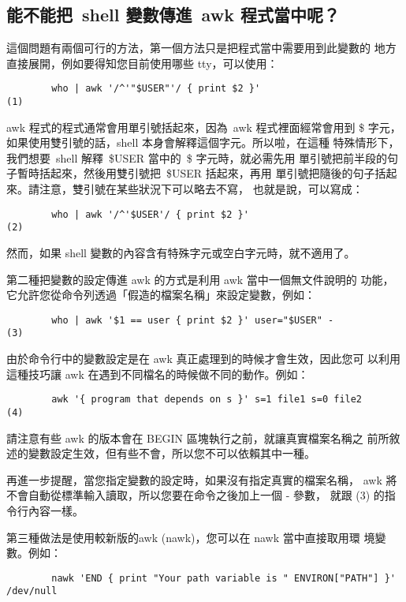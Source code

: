 \documentclass{article}
\begin{document}
\begin{CJK*}{Bg5}{ming}
\subsection{能不能把~shell 變數傳進~awk 程式當中呢？}

	這個問題有兩個可行的方法，第一個方法只是把程式當中需要用到此變數的
	地方直接展開，例如要得知您目前使用哪些 tty，可以使用：
\footnotesize
\begin{verbatim}
        who | awk '/^'"$USER"'/ { print $2 }'                           (1)
\end{verbatim}
\normalsize
	awk 程式的程式通常會用單引號括起來，因為~awk 程式裡面經常會用到 \$ 
	字元，如果使用雙引號的話，shell 本身會解釋這個字元。所以啦，在這種
	特殊情形下，我們想要~shell 解釋~\$USER 當中的~\$ 字元時，就必需先用
	單引號把前半段的句子暫時括起來，然後用雙引號把~\$USER 括起來，再用
	單引號把隨後的句子括起來。請注意，雙引號在某些狀況下可以略去不寫，
	也就是說，可以寫成：
\footnotesize
\begin{verbatim}
        who | awk '/^'$USER'/ { print $2 }'                             (2)
\end{verbatim}
\normalsize
	然而，如果 shell 變數的內容含有特殊字元或空白字元時，就不適用了。

	第二種把變數的設定傳進 awk 的方式是利用 awk 當中一個無文件說明的
	功能，它允許您從命令列透過「假造的檔案名稱」來設定變數，例如：
\footnotesize
\begin{verbatim}
        who | awk '$1 == user { print $2 }' user="$USER" -              (3)
\end{verbatim}
\normalsize
	由於命令行中的變數設定是在 awk 真正處理到的時候才會生效，因此您可
	以利用這種技巧讓 awk 在遇到不同檔名的時候做不同的動作。例如：

\footnotesize
\begin{verbatim}
        awk '{ program that depends on s }' s=1 file1 s=0 file2         (4)
\end{verbatim}
\normalsize

	請注意有些 awk 的版本會在 BEGIN 區塊執行之前，就讓真實檔案名稱之
	前所敘述的變數設定生效，但有些不會，所以您不可以依賴其中一種。

	再進一步提醒，當您指定變數的設定時，如果沒有指定真實的檔案名稱，
	awk 將不會自動從標準輸入讀取，所以您要在命令之後加上一個 - 參數，
	就跟 (3) 的指令行內容一樣。

	第三種做法是使用較新版的awk (nawk)，您可以在 nawk 當中直接取用環
	境變數。例如：
\footnotesize
\begin{verbatim}
        nawk 'END { print "Your path variable is " ENVIRON["PATH"] }' /dev/null
\end{verbatim}
\normalsize


\end{CJK*}
\end{document}

